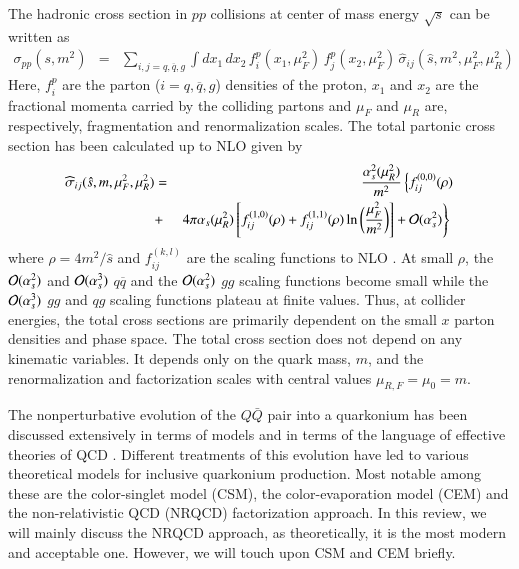 The hadronic cross section in $pp$ collisions at center of mass energy
$\sqrt{s}$ can be written as
\begin{eqnarray}
\sigma_{pp}(s,m^2) & = & \sum_{i,j = q, \overline q, g} 
\int dx_1 \, dx_2 \, 
f_i^p (x_1,\mu_F^2) \,
f_j^p(x_2,\mu_F^2) \, \widehat{\sigma}_{ij}(\hat{s},m^2,\mu_F^2,\mu_R^2)
\label{sigpp}
\end{eqnarray}
Here, $f_i^p$ are the parton (${i = q, \overline q, g}$) densities of the proton,
$x_1$ and $x_2$ are the fractional momenta carried by the colliding
partons and $\mu_F$ and $\mu_R$ are, respectively, fragmentation and renormalization scales. 
The total partonic cross section has been calculated up to NLO
\cite{Nason:1989zy,Nason:1987xz} given by
\begin{eqnarray}
\widehat{\sigma}_{ij}(\hat{s},m,\mu_F^2,\mu_R^2) & = & 
\frac{\alpha_s^2(\mu_R^2)}{m^2}
\left\{ f^{(0,0)}_{ij}(\rho) \right. \nonumber \\
 & + & \left. 4\pi \alpha_s(\mu_R^2) \left[f^{(1,0)}_{ij}(\rho) + 
f^{(1,1)}_{ij}(\rho)\ln\bigg(\frac{\mu_F^2}{m^2} \bigg) \right] 
+ {\cal O}(\alpha_s^2) \right\}
\,\, 
\label{sigpart}
\end{eqnarray}
where $\rho = 4m^2/\hat{s}$ and 
$f_{ij}^{(k,l)}$ are the scaling functions to NLO \cite{Nason:1989zy,Nason:1987xz}. 
At small $\rho$, the ${\cal O}(\alpha_s^2)$ and ${\cal O}(\alpha_s^3)$
$q \overline q$ and the ${\cal O}(\alpha_s^2)$ $gg$ scaling functions 
become small while the ${\cal O}(\alpha_s^3)$ $gg$ and $qg$ scaling functions
plateau at finite values.  Thus, at collider energies, the total cross sections
are primarily dependent on the small $x$ parton densities and phase space.
The total cross section does not depend on any kinematic variables. It depends  
only on the quark mass, $m$, and the renormalization and factorization scales with central
values $\mu_{R,F} =\mu_0 = m$.


The nonperturbative evolution of the $Q\bar Q$ pair into a quarkonium
has been discussed extensively in terms of models and in terms of the
language of effective theories of QCD
\cite{Bodwin:1994jh,Brambilla:2004wf}. Different
treatments of this evolution have led to various theoretical models for
inclusive quarkonium production. Most notable among these are the color-singlet
model (CSM), the color-evaporation model (CEM) and the non-relativistic QCD
(NRQCD) factorization approach. In this review, we will mainly discuss the NRQCD 
approach, as theoretically, it is the most modern and acceptable one. However,
we will touch upon CSM and CEM briefly. 





